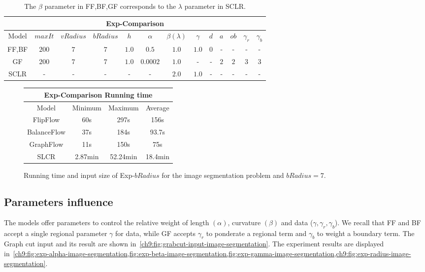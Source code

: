 \begin{table}
\small
\centering
\begin{tabular}{|c|c|c|c|c|c|c|c|c|c|c|c|c|}
\hline
\multicolumn{13}{|c|}{Exp-Comparison}\\
\hline
Model & $maxIt$ & $vRadius$ & $bRadius$ & $h$ & $\alpha$ & $\beta (\lambda)$  & $\gamma$ & $d$ & $a$ & $ob$ & $\gamma_r$ & $\gamma_b$ \\
\hline
FF,BF & $200$ & $7$ & $7$ & $1.0$ & $0.5$ & $1.0$ & $1.0$ & $0$ & - & - & - & -\\
\hline
GF & $200$ & $7$ & $7$ & $1.0$ & $0.0002$ & $1.0$ & - & - & $2$ & $2$ & $3$ & $3$\\
\hline
SCLR & - & - & - & - & - & $2.0$ & $1.0$ & - & - & - & - & -\\
\hline
\end{tabular}
\caption{ The $\beta$ parameter in FF,BF,GF corresponds to the $\lambda$ parameter in SCLR.}
\label{ch9:tab:image-segmentation-comparison-summary}
\end{table}

\begin{figure}
\center
\captionsetup{type=table}
\begin{tabular}{|c|c|c|c|}
\hline
\multicolumn{4}{|c|}{Exp-Comparison Running time}\\
\hline
Model & Minimum & Maximum & Average \\
\hline
FlipFlow & 60s & 297s & 156s\\
BalanceFlow & 37s & 184s & 93.7s\\
GraphFlow & 11s & 150s & 75s\\
SLCR & 2.87min & 52.24min & 18.4min\\
\hline
\end{tabular}
\caption{Running time and input size of Exp-$bRadius$ for the image segmentation problem and $bRadius=7$.}
\label{ch9:tab:rtime-image-segmentation-general} 
\end{figure}

\subsection{Parameters influence}
The models offer parameters to control the relative weight of length $(\alpha)$, curvature $(\beta)$ and data ($\gamma,\gamma _r, \gamma _b$). We recall that FF and BF accept a single regional parameter $\gamma$ for data, while GF accepts $\gamma _r$ to ponderate a regional term and $\gamma _b$ to weight a boundary term. The Graph cut input and its result are shown in~\cref{ch9:fig:grabcut-input-image-segmentation}. The experiment results are displayed in~\cref{ch9:fig:exp-alpha-image-segmentation,fig:exp-beta-image-segmentation,fig:exp-gamma-image-segmentation,ch9:fig:exp-radius-image-segmentation}. 

